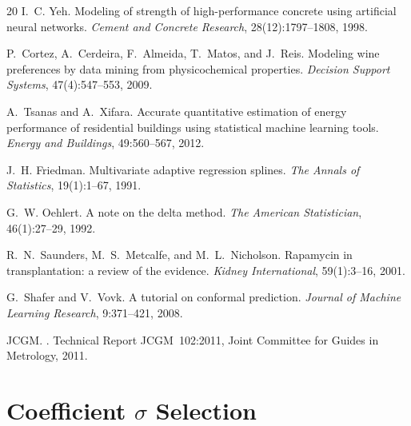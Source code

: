 \documentclass{article}
\begin{document}
\begin{thebibliography}{20}
I.~C. Yeh.
\newblock Modeling of strength of high-performance concrete using artificial
  neural networks.
\newblock \emph{Cement and Concrete Research}, 28(12):1797--1808, 1998.

P.~Cortez, A.~Cerdeira, F.~Almeida, T.~Matos, and J.~Reis.
\newblock Modeling wine preferences by data mining from physicochemical
  properties.
\newblock \emph{Decision Support Systems}, 47(4):547--553, 2009.

A.~Tsanas and A.~Xifara.
\newblock Accurate quantitative estimation of energy performance of residential
  buildings using statistical machine learning tools.
\newblock \emph{Energy and Buildings}, 49:560--567, 2012.

J.~H. Friedman.
\newblock Multivariate adaptive regression splines.
\newblock \emph{The Annals of Statistics}, 19(1):1--67, 1991.

G.~W. Oehlert.
\newblock A note on the delta method.
\newblock \emph{The American Statistician}, 46(1):27--29, 1992.

R.~N.~Saunders, M.~S.~Metcalfe, and M.~L.~Nicholson.
\newblock Rapamycin in transplantation: a review of the evidence.
\newblock \emph{Kidney International}, 59(1):3--16, 2001.

G.~Shafer and V.~Vovk.
\newblock A tutorial on conformal prediction.
\newblock \emph{Journal of Machine Learning Research}, 9:371--421, 2008.

{JCGM}.
.
\newblock Technical Report JCGM~102:2011, Joint Committee for Guides in
  Metrology, 2011.

\end{thebibliography}

\appendix

\section{Coefficient $\sigma$ Selection}
\label{app:sigma}
\end{document}
